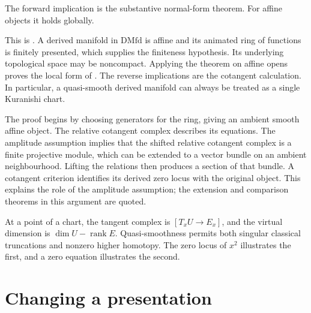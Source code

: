 
The forward implication is the substantive normal-form theorem. For
affine objects it holds globally.


This is \citet[Proposition~5.1.1.11 and Corollary~5.1.1.13]
{Steffens_Derived_Differential_Geometry}. A derived manifold in
$\mathrm{DMfd}$ is affine and its animated ring of functions is finitely
presented, which supplies the finiteness hypothesis. Its underlying topological
space may be noncompact. Applying the theorem on affine opens
proves the local form of . The reverse
implications are the cotangent calculation. In particular, a
quasi-smooth derived manifold can always be treated as a single
Kuranishi chart.

The proof begins by choosing generators for the ring, giving an
ambient smooth affine object. The relative cotangent complex describes
its equations. The amplitude assumption implies that the shifted
relative cotangent complex is a finite projective module, which can
be extended to a vector bundle on an ambient neighbourhood.
Lifting the relations then produces a section of that bundle.
A cotangent criterion identifies its derived zero locus with the
original object. This explains the role of the amplitude assumption;
the extension and comparison theorems in this argument are quoted.

At a point of a chart, the tangent complex is
$[T_xU\to E_x]$, and the virtual dimension is
$\dim U-\operatorname{rank}E$. Quasi-smoothness permits both singular
classical truncations and nonzero higher homotopy. The zero locus of
$x^2$ illustrates the first, and a zero equation illustrates the second.

\section{Changing a presentation}

